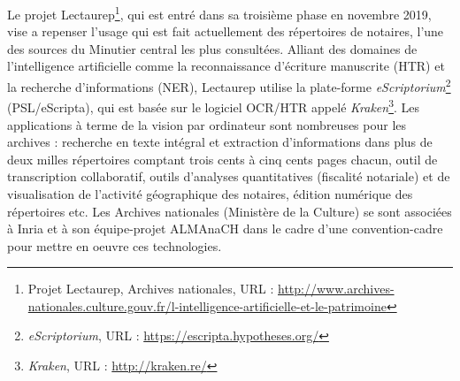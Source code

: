 Le projet Lectaurep\footnote{Projet Lectaurep, Archives nationales, URL : \url{http://www.archives-nationales.culture.gouv.fr/l-intelligence-artificielle-et-le-patrimoine}}, qui est entré dans sa troisième phase en novembre 2019, vise a repenser l'usage qui est fait actuellement des répertoires de notaires, l'une des sources du Minutier central les plus consultées. Alliant des domaines de l'intelligence artificielle comme la reconnaissance d'écriture manuscrite (HTR) et la recherche d'informations (NER), Lectaurep utilise  la plate-forme \textit{eScriptorium}\footnote{\textit{eScriptorium}, URL : \url{https://escripta.hypotheses.org/}} (PSL/eScripta), qui est basée sur le logiciel OCR/HTR appelé \textit{Kraken}\footnote{\textit{Kraken}, URL : \url{http://kraken.re/}}. Les applications à terme de la vision par ordinateur sont nombreuses pour les archives : recherche en texte intégral et extraction d'informations dans plus de deux milles répertoires comptant trois cents à cinq cents pages chacun, outil de transcription collaboratif, outils d'analyses quantitatives (fiscalité notariale) et de visualisation de l'activité géographique des notaires, édition numérique des répertoires etc. Les Archives nationales (Ministère de la Culture) se sont associées à Inria et à son équipe-projet ALMAnaCH dans le cadre d'une convention-cadre pour mettre en oeuvre ces technologies.\\

